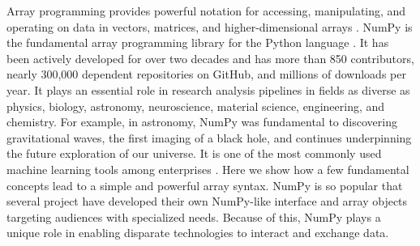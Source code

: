 




Array programming provides powerful notation for accessing,
manipulating, and operating on data in vectors, matrices, and
higher-dimensional arrays \cite{iverson1980notation}.
NumPy is the fundamental array programming library for the Python language
\cite{dubois2007guest,oliphant2007python,millman2011python,perez2011python}.
It has been actively developed for over two decades and has more than 850
contributors, nearly 300,000 dependent repositories on GitHub, and millions of
downloads per year.
It plays an essential role in research analysis pipelines in fields as
diverse as physics, biology, astronomy, neuroscience, material science,
engineering, and chemistry.
For example, in astronomy, NumPy was fundamental to discovering gravitational
waves\cite{pycbc}, the first imaging of a black hole\cite{eht-imaging}, and
continues underpinning the future exploration of our
universe\cite{jenness2018lsst}.
It is one of the most commonly used machine learning tools among
enterprises \cite{451report2018}.
Here we show how a few fundamental concepts lead to a simple and powerful array syntax.
NumPy is so popular that several project have developed their own
NumPy-like interface and array objects targeting audiences with specialized
needs.
Because of this, NumPy plays a unique role in enabling disparate technologies
to interact and exchange data.
